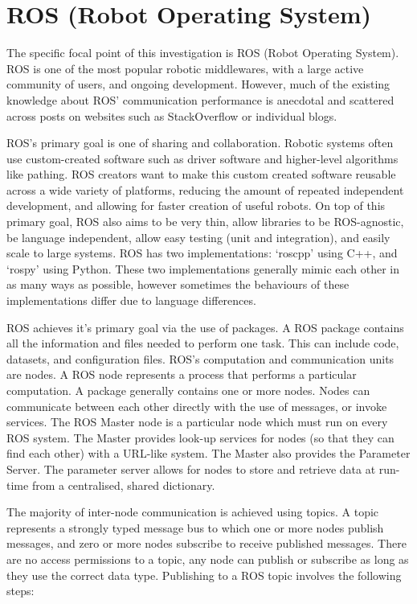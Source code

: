 \documentclass[../dissertation.tex]{subfiles}
\begin{document}
\section{ROS (Robot Operating System)}
\label{background-ros}

The specific focal point of this investigation is ROS (Robot Operating System). ROS is one of the most popular robotic middlewares, with a large active community of users, and ongoing development. However, much of the existing knowledge about ROS' communication performance is anecdotal and scattered across posts on websites such as StackOverflow or individual blogs.

ROS's primary goal is one of sharing and collaboration. Robotic systems often use custom-created software such as driver software and higher-level algorithms like pathing. ROS creators want to make this custom created software reusable across a wide variety of platforms, reducing the amount of repeated independent development, and allowing for faster creation of useful robots. On top of this primary goal, ROS also aims to be very thin, allow libraries to be ROS-agnostic, be language independent, allow easy testing (unit and integration), and easily scale to large systems. ROS has two implementations: `roscpp' using C++, and `rospy' using Python. These two implementations generally mimic each other in as many ways as possible, however sometimes the behaviours of these implementations differ due to language differences.

ROS achieves it's primary goal via the use of packages. A ROS package contains all the information and files needed to perform one task. This can include code, datasets, and configuration files. ROS's computation and communication units are nodes. A ROS node represents a process that performs a particular computation. A package generally contains one or more nodes. Nodes can communicate between each other directly with the use of messages, or invoke services. The ROS Master node is a particular node which must run on every ROS system. The Master provides look-up services for nodes (so that they can find each other) with a URL-like system. The Master also provides the Parameter Server. The parameter server allows for nodes to store and retrieve data at run-time from a centralised, shared dictionary.

The majority of inter-node communication is achieved using topics. A topic represents a strongly typed message bus to which one or more nodes publish messages, and zero or more nodes subscribe to receive published messages. There are no access permissions to a topic, any node can publish or subscribe as long as they use the correct data type. Publishing to a ROS topic involves the following steps:
\end{document}
